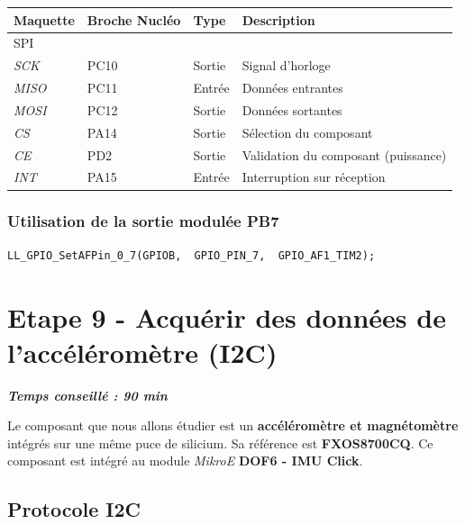 \documentclass[a4paper,11pt,titlepage]{article} %
\begin{document}
\begin{center}
\begin{tabular}{|l|l|l|l|}
\hline 
Maquette & \textbf{Broche Nucléo} & Type & Description \\ 
\hline 
\textsc{SPI} & & & \\ 
\textit{SCK} & PC10 & Sortie & Signal d'horloge\\
\textit{MISO} & PC11 & Entrée & Données entrantes\\
\textit{MOSI} & PC12 & Sortie & Données sortantes\\ 
\hline  
\textit{CS} & PA14 & Sortie & Sélection du composant\\ 
\textit{CE} & PD2 & Sortie & Validation du composant (puissance)\\ 
\textit{INT} & PA15 & Entrée & Interruption sur réception\\ 
\hline  
\end{tabular} 
\end{center}


\subsubsection{Utilisation de la sortie modulée PB7}
	
\begin{lstlisting}
LL_GPIO_SetAFPin_0_7(GPIOB,  GPIO_PIN_7,  GPIO_AF1_TIM2);
\end{lstlisting}





\newpage


\section{Etape 9 - Acquérir des données de l'accéléromètre (I2C)}

\begin{center} \textbf{\textit{Temps conseillé : 90 min}} \end{center}

Le composant que nous allons étudier est un \textbf{accéléromètre et magnétomètre} intégrés sur une même puce de silicium. Sa référence est \textbf{FXOS8700CQ}. Ce composant est intégré au module \textit{MikroE} \textbf{DOF6 - IMU Click}.

\subsection{Protocole I2C}
\end{document}
